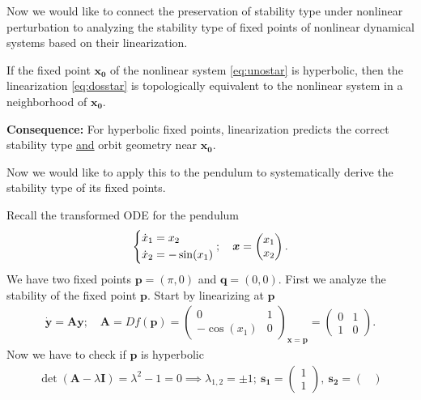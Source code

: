 Now we would like to connect the preservation of stability type under nonlinear perturbation to analyzing the stability type of fixed points of nonlinear dynamical systems based on their linearization. 
\begin{theorem}
	If the fixed point $\bm{x_0} $ of the nonlinear system \eqref{eq:unostar} is hyperbolic, then the linearization \eqref{eq:dosstar} is topologically equivalent to the nonlinear system in a neighborhood of $\bm{x_0} $. 

	\textbf{Consequence:} For hyperbolic fixed points, linearization predicts the correct stability type \underline{and} orbit geometry near $\bm{x_0} $. 
\end{theorem}
Now we would like to apply this to the pendulum to systematically derive the stability type of its fixed points.
\begin{ex}
	Recall the transformed ODE for the pendulum
	\begin{align}
		\begin{dcases}
		\dot{x}_{1} = x_2 \\ \dot{x}_2 = -\sin(x_1)	
		\end{dcases}
		;\quad \bm{x}  = 
		\begin{pmatrix}
			x_1 \\ x_2
		\end{pmatrix}
		.
	\end{align}
	We have two fixed points $\bm{p} =(\pi ,0)$ and $\bm{q} = (0,0)$. First we analyze the stability of the fixed point $\bm{p} $. Start by linearizing at $\bm{p} $ 
	\begin{align}
		\dot{\bm{y} } = \bm{Ay};\quad \bm{A}  = Df(\bm{p} ) = 
		\begin{pmatrix}
			0 & 1 \\
			- \cos(x_1) & 0
		\end{pmatrix}_{\bm{x} = \bm{p} } =
		\begin{pmatrix}
			0 & 1 \\ 1 & 0
		\end{pmatrix}.
	\end{align}
	Now we have to check if $\bm{p} $ is hyperbolic
	\begin{align}
		\det(\bm{A} - \lambda \bm{I} ) = \lambda^2 -1 = 0 \implies \lambda_{1,2} = \pm 1;\ \bm{s_1} =
		\begin{pmatrix}
			1 \\ 1
		\end{pmatrix}
		,\ \bm{s_2} =
		\begin{pmatrix}

\end{pmatrix}
\end{align}
\end{ex}
